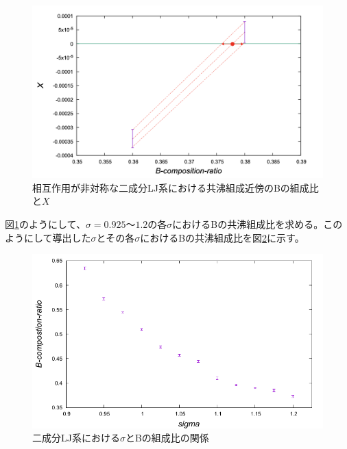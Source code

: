 \documentclass[titlepage]{jsreport}
\begin{document}
\begin{figure}[htbp]
    \begin{center}
        \includegraphics[width=14cm]{fig/bi-asymmetric-b-part/L100T1.0E1.05.pdf}
    \end{center}
    \caption{相互作用が非対称な二成分LJ系における共沸組成近傍のBの組成比と$X$}
    \label{fig:bi-asymmetric-b-part}
\end{figure}

\newpage
図\ref{fig:bi-asymmetric-b-part}のようにして、$\sigma=0.925〜1.2$の各$\sigma$におけるBの共沸組成比を求める。このようにして導出した$\sigma$とその各$\sigma$におけるBの共沸組成比を図\ref{fig:sigma-composition_ratio}に示す。

\begin{figure}[htbp]
    \begin{center}
        \includegraphics[width=14cm]{fig/sigma-composition_ratio/sigma-composition_ratio.pdf}
    \end{center}
    \caption{二成分LJ系における$\sigma$とBの組成比の関係}
    \label{fig:sigma-composition_ratio}
\end{figure}
\end{document}
